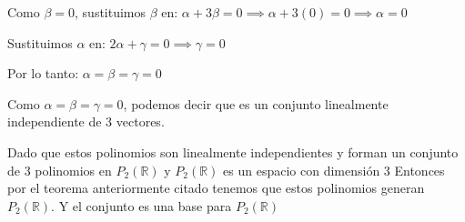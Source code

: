 \begin{enumerate}
    Como $\beta = 0$, sustituimos $\beta$ en: $\alpha + 3\beta = 0 \implies \alpha + 3(0) = 0 \implies \alpha = 0$

    Sustituimos $\alpha$ en: $2\alpha + \gamma = 0 \implies \gamma = 0$

    Por lo tanto: $\alpha = \beta = \gamma = 0$

    Como $\alpha = \beta = \gamma = 0$, podemos decir que es un conjunto linealmente independiente de 3 vectores.

    Dado que estos polinomios son linealmente independientes y forman un conjunto de 3 polinomios en $P_{2}(\mathbb{R})$ y $P_{2}(\mathbb{R})$ es un espacio con dimensión 3 Entonces por el teorema
    anteriormente citado tenemos que estos polinomios generan $P_{2}(\mathbb{R})$. Y el conjunto es una base
    para $P_{2}(\mathbb{R})$

\end{enumerate}